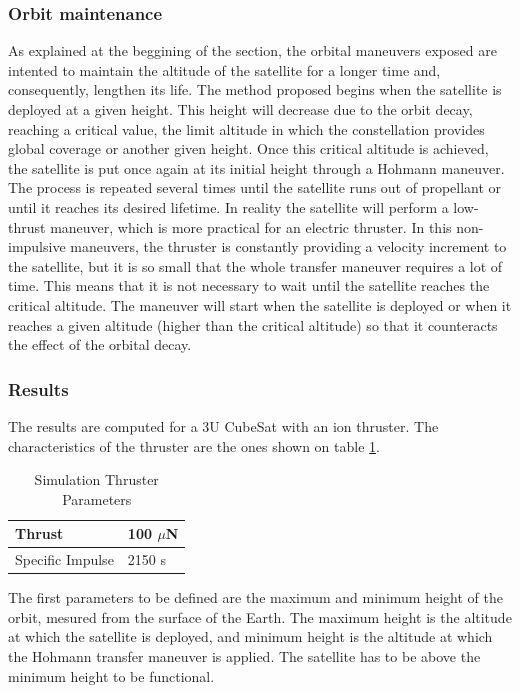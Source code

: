 \subsubsection{Orbit maintenance}
As explained at the beggining of the section, the orbital maneuvers exposed are intented to maintain the altitude of the satellite for a longer time and, consequently, lengthen its life.
The method proposed begins when the satellite is deployed at a given height. This height will decrease due to the orbit decay, reaching a critical value, the limit altitude in which the constellation provides global coverage or another given height. Once this critical altitude is achieved, the satellite is put once again at its initial height through a Hohmann maneuver.
The process is repeated several times until the satellite runs out of propellant or until it reaches its desired lifetime.
\newline
In reality the satellite will perform a low-thrust maneuver, which is more practical for an electric thruster. In this non-impulsive maneuvers, the thruster is constantly providing a velocity increment to the satellite, but it is so small that the whole transfer maneuver requires a lot of time. This means that it is not necessary to wait until the satellite reaches the critical altitude. The maneuver will start when the satellite is deployed or when it reaches a given altitude (higher than the critical altitude) so that it counteracts the effect of the orbital decay.

\subsubsection{Results}
The results are computed for a 3U CubeSat with an ion thruster. The characteristics of the thruster are the ones shown on table \ref{thrustspimpulse}.

\begin{table}
\begin{center}
\begin{tabular}{ | l | l | }
\hline
Thrust & 100 $\mu$N \\ 
\hline 
Specific Impulse & 2150 s \\
\hline
\end{tabular}
\caption{Simulation Thruster Parameters}
\label{thrustspimpulse}
\end{center}
\end{table}

\noindent
The first parameters to be defined are the maximum and minimum height of the orbit, mesured from the surface of the Earth. The maximum height is the altitude at which the satellite is deployed, and minimum height is the altitude at which the Hohmann transfer maneuver is applied. The satellite has to be above the minimum height to be functional.

